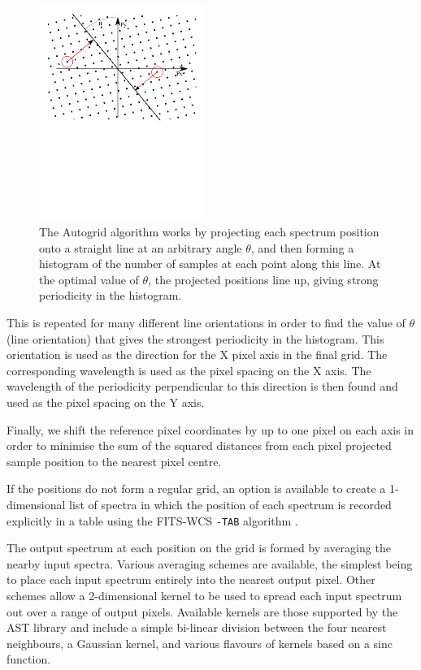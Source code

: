 \documentclass[final,authoryear,5p,times,twocolumn]{elsarticle}
\begin{document}
\begin{figure}
\includegraphics[width=0.48\textwidth]{autogrid}
\caption{The Autogrid algorithm works by projecting each spectrum
  position onto a straight line at an arbitrary angle $\theta$, and then
  forming a histogram of the number of samples at each point along
  this line. At the optimal value of $\theta$, the projected positions
  line up, giving strong periodicity in the histogram.}
\label{fig:autogrid}
\end{figure}

This is repeated for many different line orientations in order to find
the value of $\theta$ (line orientation) that gives the strongest
periodicity in the histogram. This orientation is used as the
direction for the X pixel axis in the final grid. The corresponding
wavelength is used as the pixel spacing on the X axis. The wavelength
of the periodicity perpendicular to this direction is then found and
used as the pixel spacing on the Y axis.

Finally, we shift the reference pixel coordinates by up to one pixel
on each axis in order to minimise the sum of the squared distances
from each pixel projected sample position to the nearest pixel centre.

If the positions do not form a regular grid, an option is available to
create a 1-dimensional list of spectra in which the position of each
spectrum is recorded explicitly in a table using the FITS-WCS
\texttt{-TAB} algorithm \citep{2006A&A...446..747G}.

The output spectrum at each position on the grid is formed by
averaging the nearby input spectra. Various averaging schemes are
available, the simplest being to place each input spectrum entirely
into the nearest output pixel. Other schemes allow a 2-dimensional
kernel to be used to spread each input spectrum out over a range of
output pixels. Available kernels are those supported by the AST
library \citep{SUN211,2012ASPC..461..825B} and include a simple
bi-linear division between the four nearest neighbours, a Gaussian
kernel, and various flavours of kernels based on a sinc function.
\end{document}
